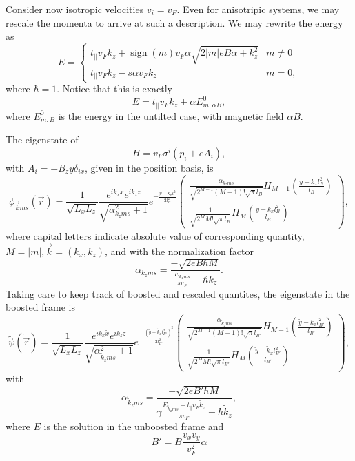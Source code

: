 Consider now isotropic velocities \( v_i = v_F \).
Even for anisotripic systems, we may rescale the momenta to arrive at such a description.
We may rewrite the energy as
\[
  E =
  \begin{cases}
    t_{\parallel} v_F k_z + \operatorname{sign}(m) v_F \alpha \sqrt{2 |m| e B \alpha + k_z^2} & m\neq 0\\
    t_{\parallel} v_F k_z - s \alpha v_F k_z & m=0,
  \end{cases}
\]
where \( \hbar = 1 \).
Notice that this is exactly
\[
E = t_{\parallel} v_F k_z + \alpha E^0_{m, \alpha B},
\]
where \( E^0_{m, B} \) is the energy in the untilted case, with magnetic field \( \alpha B \).

The eigenstate of
\[
H = v_{F} \sigma ^{i} ( p_{i} + e A_{i} ),
\]
with \(A_{i} = - B_{z} y \delta _{i x}\), given in the position basis, is
\begin{equation}
  \phi _{\vec{k} m s}(\vec{r}) = \frac{1}{\sqrt{L_xL_z}}
  \frac{e^{ik_x x}e^{ik_z z}}{\sqrt{\alpha _{k_z m s}^2 + 1}}
  e^{-\frac{y-k_x l^2}{2 l_B^2}}
  \begin{pmatrix}
    \frac{\alpha _{k_z m s}}{\sqrt{2^{M-1} (M-1)! \sqrt{\pi } l_B}} H_{M-1}\left( \frac{y-k_x l_B^2}{l_B} \right)\\
    \frac{1}{\sqrt{2^M M! \sqrt{\pi } l_B}} H_M \left( \frac{y-k_x l_B^2}{l_B} \right)
  \end{pmatrix},
\end{equation}
where capital letters indicate absolute value of corresponding quantity, $M=|m|, \vec{k} = (k_x, k_z)$, and with the normalization factor
\begin{equation}
  \alpha _{k_z m s} = \frac{-\sqrt{2eB\hbar M}}{\frac{E_{k_z m s}}{s v_{F}} - \hbar  k_z}.
\end{equation}
Taking care to keep track of boosted and rescaled quantites, the eigenstate in the boosted frame is
\begin{equation}
  \label{eq:29}
  \tilde{\psi}(\tilde{\vec{r}}) =
  \frac{1}{\sqrt{L_xL_z}}
  \frac{e^{i \tilde{k}_x \tilde{x}}e^{i k_z z}}{\sqrt{\alpha _{\tilde{k}_z m s}^2 + 1}}
  e^{-\frac{\left(\tilde{y} - \tilde{k}_x l_{B'}^2\right)^2}{2 l_{B'}^2}}
  \begin{pmatrix}
    \frac{\alpha _{\tilde{k}_z m s}}{\sqrt{2^{M-1} (M-1)! \sqrt{\pi } l_{B'}}} H_{M-1}\left( \frac{\tilde{y} - \tilde{k}_x l_{B'}^2}{l_{B'}} \right)\\
    \frac{1}{\sqrt{2^M M! \sqrt{\pi } l_{B'}}} H_M \left( \frac{\tilde{y} - \tilde{k}_x l_{B'}^2}{l_{B'}} \right)
  \end{pmatrix},
\end{equation}
with
\begin{equation}
  \alpha _{\tilde{k}_z m s} = \frac{-\sqrt{2e B' \hbar M}}{ \gamma \frac{E_{\tilde{k}_z m s} - t_{\parallel} v_{F} \tilde{k}_{z}}{s v_{F}} - \hbar  \tilde{k}_z},
\end{equation}
where \(E\) is the solution in the unboosted frame and
\[
B' = B \frac{v_{x} v_{y}}{v_{F}^2} \alpha
\]


